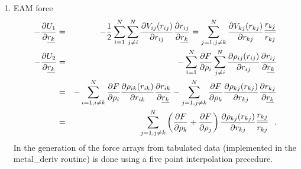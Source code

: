 \begin{enumerate}
\item EAM force
\begin{eqnarray}
-\frac{\partial U_{1}}{\partial \mbox{$\underline{r_{k}}$}} &=& -{1 \over 2} \sum_{i=1}^{N} \sum_{j \ne i}^{N}
\frac{\partial V_{ij}(r_{ij})}{\partial r_{ij}} \frac{\partial r_{ij}}{\partial \mbox{$\underline{r_{k}}$}} =
\sum_{j=1,j \ne k}^{N} \frac{\partial V_{kj}(r_{kj})}{\partial r_{kj}} \frac{\mbox{$\underline{r_{kj}}$}}{r_{kj}} \nonumber \\
-\frac{\partial U_{2}}{\partial \mbox{$\underline{r_{k}}$}} &=& -\sum_{i=1}^{N} \frac{\partial F}{\partial \rho_{i}}
\sum_{j \ne i}^{N} \frac{\partial \rho_{ij}(r_{ij})}{\partial r_{ij}} \frac{\partial r_{ij}}{\partial \mbox{$\underline{r_{k}}$}} \\
&=& -\sum_{i=1,i \ne k}^{N} \frac{\partial F}{\partial \rho_{i}} \frac{\partial \rho_{ik}(r_{ik})}{\partial r_{ik}}
\frac{\partial r_{ik}}{\partial \mbox{$\underline{r_{k}}$}} - \sum_{j=1,j \ne k}^{N} \frac{\partial F}{\partial \rho_{k}}
\frac{\partial \rho_{kj}(r_{kj})}{\partial r_{kj}} \frac{\partial r_{kj}}{\partial \mbox{$\underline{r_{k}}$}} \nonumber \\
&=& \sum_{j=1,j \ne k}^{N} \left( \frac{\partial F}{\partial \rho_{k}} + \frac{\partial F}{\partial \rho_{j}} \right)
\frac{\partial \rho_{kj}(r_{kj})}{\partial r_{kj}} \frac{\mbox{$\underline{r_{kj}}$}}{r_{kj}}~~. \nonumber
\end{eqnarray}
In \D{} the generation of the force arrays from
tabulated data (implemented in the {\sc metal\_deriv}
routine) is done using a five point interpolation precedure.


\end{enumerate}
